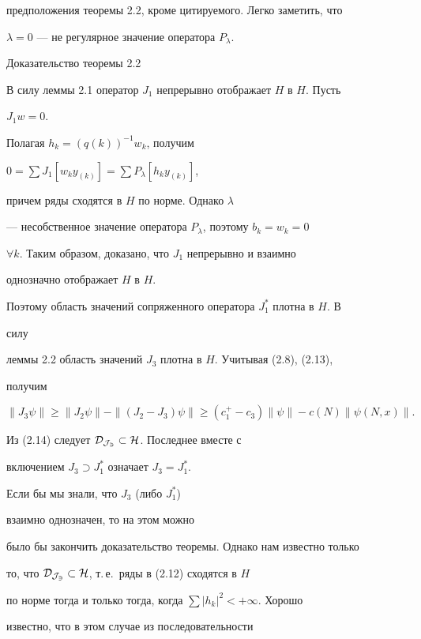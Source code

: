 предположения теоремы 2.2, кроме цитируемого. Легко заметить, что 


$\lambda=0$ --- не регулярное значение оператора $P_\lambda$. 


 


\begin{pf*}{Доказательство теоремы 2.2} 


В силу леммы 2.1 оператор $J_1$ непрерывно отображает $H$ в $H$. Пусть 


$J_1w=0$. 


Полагая $h_k=(q(k))^{-1}w_k$, получим


$0=\sum J_1[w_k y_{(k)}]=\sum P_\lambda[h_k y_{(k)}]$, 


причем ряды сходятся в $H$ по норме. Однако $\lambda$ 


--- несобственное значение оператора $P_\lambda$, поэтому $b_k=w_k=0$ 


$\forall k$. Таким образом, доказано, что $J_1$ непрерывно и взаимно 


однозначно отображает $H$ в $H$. 


Поэтому область значений сопряженного оператора $J^*_1$ плотна в $H$. В 


силу 


леммы 2.2 область значений $J_3$ плотна в $H$. Учитывая (2.8), (2.13), 


получим 


\begin{equation} 


\|J_3\psi\|\ge\|J_2\psi\|-\|(J_2-J_3)\psi\|\ge 


(c^+_1-c_3)\|\psi\|-c(N)\|\psi(N,x)\|. 


\end{equation} 


Из (2.14) следует $\cal D_{J_3}\subset H$. Последнее вместе с 


включением $J_3\supset J^*_1$ означает $J_3=J^*_1$. 


Если бы мы знали, что $J_3$ (либо $J^*_1$) 


взаимно однозначен, то на этом можно 


было бы закончить доказательство теоремы. Однако нам известно только 


то, что $\cal D_{J_3}\subset H$, т.\,е.~ряды в (2.12) сходятся в $H$ 


по норме тогда и только тогда, когда $\sum|h_k|^2<+\infty$. Хорошо 


известно, что в этом случае из последовательности 



\end{pf*}
